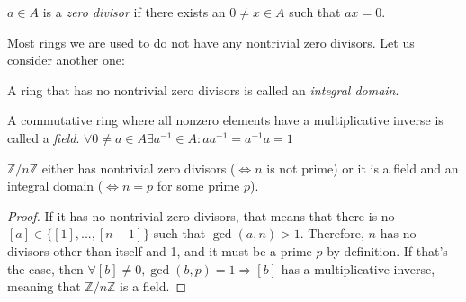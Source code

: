 \begin{definition}\label{zerodiv-def}
  $a \in A$ is a \emph{zero divisor} if there exists an $0 \neq x \in A$ such that $ax = 0$. 
\end{definition}
Most rings we are used to do not have any nontrivial zero divisors. Let us consider another one: 

\begin{definition}
  A ring that has no nontrivial zero divisors is called an \emph{integral domain}.
\end{definition}
\begin{definition}
  A commutative ring where all nonzero elements have a multiplicative inverse is called a \emph{field}. $\forall 0 \neq a \in A \exists a^{-1} \in A : a a^{-1} = a^{-1} a = 1$
\end{definition}
\begin{corollary}
  $\mathbb{Z}/n\mathbb{Z}$ either has nontrivial zero divisors ($\Leftrightarrow n$ is not prime) or it is a field and an integral domain ($\Leftrightarrow n = p$ for some prime $p$). 
\end{corollary}
\begin{proof}
  If it has no nontrivial zero divisors, that means that there is no $[a] \in \{[1], ..., [n - 1]\}$ such that $\gcd(a, n) > 1$. Therefore, $n$ has no divisors other than itself and 1, and it must be a prime $p$ by definition. If that's the case, then $\forall [b] \neq 0, \gcd(b, p) = 1 \Rightarrow [b]$ has a multiplicative inverse, meaning that $\mathbb{Z}/n\mathbb{Z}$ is a field.
\end{proof}

